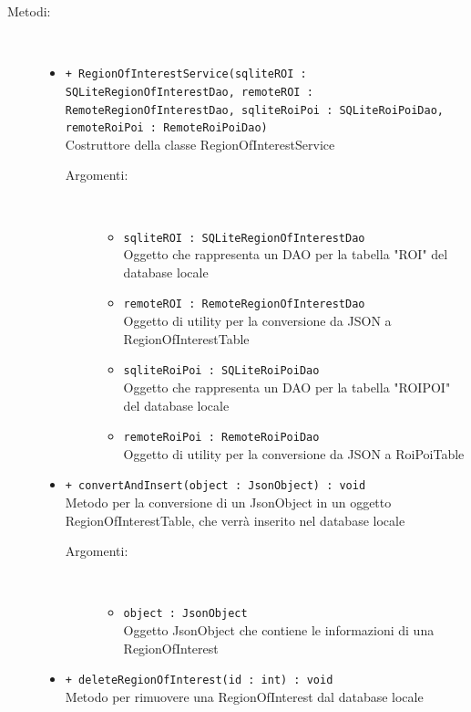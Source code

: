 \documentclass[../DefinizioneDiProdotto.tex]{subfiles}
\begin{document}
\begin{description}
\begin{itemize}
	\end{itemize}
	\item[Metodi:] \
	\begin{itemize}
		\item \texttt{+ RegionOfInterestService(sqliteROI : SQLiteRegionOfInterestDao, remoteROI : RemoteRegionOfInterestDao, sqliteRoiPoi : SQLiteRoiPoiDao, remoteRoiPoi : RemoteRoiPoiDao)}\\
		Costruttore della classe RegionOfInterestService
		\begin{description}
			\item[Argomenti:] \
			\begin{itemize}
				\item \texttt{sqliteROI : SQLiteRegionOfInterestDao}\\
				Oggetto che rappresenta un DAO per la tabella "ROI" del database locale\item \texttt{remoteROI : RemoteRegionOfInterestDao}\\
				Oggetto di utility per la conversione da JSON a RegionOfInterestTable\item \texttt{sqliteRoiPoi : SQLiteRoiPoiDao}\\
				Oggetto che rappresenta un DAO per la tabella "ROIPOI" del database locale\item \texttt{remoteRoiPoi : RemoteRoiPoiDao}\\
				Oggetto di utility per la conversione da JSON a RoiPoiTable\end{itemize}
		\end{description}
		\item \texttt{+ convertAndInsert(object : JsonObject) : void}\\
		Metodo per la conversione di un JsonObject in un oggetto RegionOfInterestTable, che verrà inserito nel database locale
		\begin{description}
			\item[Argomenti:] \
			\begin{itemize}
				\item \texttt{object : JsonObject}\\
				Oggetto JsonObject che contiene le informazioni di una RegionOfInterest\end{itemize}
		\end{description}
		\item \texttt{+ deleteRegionOfInterest(id : int) : void}\\
		Metodo per rimuovere una RegionOfInterest dal database locale
		\begin{description}

\end{description}
\end{itemize}
\end{description}
\end{document}
